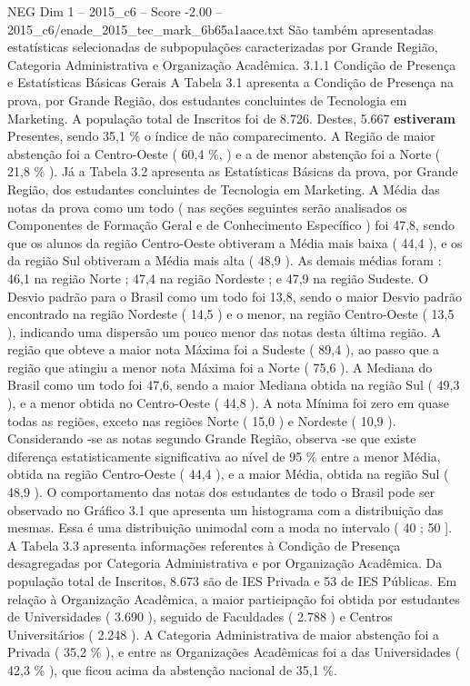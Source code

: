 \begin{textsample}{NEG Dim 1 – 2015\_c6 – Score -2.00 – 2015\_c6/enade\_2015\_tec\_mark\_6b65a1aace.txt}
São também apresentadas estatísticas selecionadas de subpopulações caracterizadas por Grande Região, Categoria Administrativa e Organização Acadêmica. 3.1.1 Condição de Presença e Estatísticas Básicas Gerais A Tabela 3.1 apresenta a Condição de Presença na prova, por Grande Região, dos estudantes concluintes de Tecnologia em Marketing.
A população total de Inscritos foi de 8.726.
Destes, 5.667 \textbf{estiveram} Presentes, sendo 35,1 \% o índice de não comparecimento.
A Região de maior abstenção foi a Centro-Oeste ( 60,4 \%, ) e a de menor abstenção foi a Norte ( 21,8 \% ).
Já a Tabela 3.2 apresenta as Estatísticas Básicas da prova, por Grande Região, dos estudantes concluintes de Tecnologia em Marketing.
A Média das notas da prova como um todo ( nas seções seguintes serão analisados os Componentes de Formação Geral e de Conhecimento Específico ) foi 47,8, sendo que os alunos da região Centro-Oeste obtiveram a Média mais baixa ( 44,4 ), e os da região Sul obtiveram a Média mais alta ( 48,9 ).
As demais médias foram : 46,1 na região Norte ; 47,4 na região Nordeste ; e 47,9 na região Sudeste.
O Desvio padrão para o Brasil como um todo foi 13,8, sendo o maior Desvio padrão encontrado na região Nordeste ( 14,5 ) e o menor, na região Centro-Oeste ( 13,5 ), indicando uma dispersão um pouco menor das notas desta última região.
A região que obteve a maior nota Máxima foi a Sudeste ( 89,4 ), ao passo que a região que atingiu a menor nota Máxima foi a Norte ( 75,6 ).
A Mediana do Brasil como um todo foi 47,6, sendo a maior Mediana obtida na região Sul ( 49,3 ), e a menor obtida no Centro-Oeste ( 44,8 ).
A nota Mínima foi zero em quase todas as regiões, exceto nas regiões Norte ( 15,0 ) e Nordeste ( 10,9 ).
Considerando -se as notas segundo Grande Região, observa -se que existe diferença estatisticamente significativa ao nível de 95 \% entre a menor Média, obtida na região Centro-Oeste ( 44,4 ), e a maior Média, obtida na região Sul ( 48,9 ).
O comportamento das notas dos estudantes de todo o Brasil pode ser observado no Gráfico 3.1 que apresenta um histograma com a distribuição das mesmas.
Essa é uma distribuição unimodal com a moda no intervalo ( 40 ; 50 ].
A Tabela 3.3 apresenta informações referentes à Condição de Presença desagregadas por Categoria Administrativa e por Organização Acadêmica.
Da população total de Inscritos, 8.673 são de IES Privada e 53 de IES Públicas.
Em relação à Organização Acadêmica, a maior participação foi obtida por estudantes de Universidades ( 3.690 ), seguido de Faculdades ( 2.788 ) e Centros Universitários ( 2.248 ).
A Categoria Administrativa de maior abstenção foi a Privada ( 35,2 \% ), e entre as Organizações Acadêmicas foi a das Universidades ( 42,3 \% ), que ficou acima da abstenção nacional de 35,1 \%.

\end{textsample}
